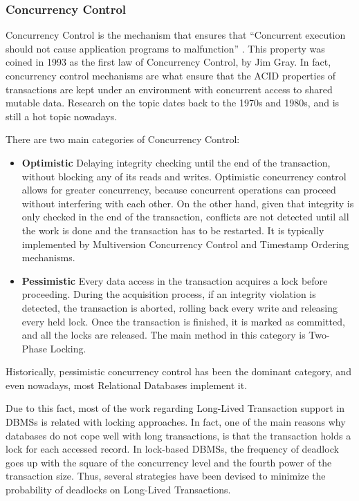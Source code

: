 \documentclass{llncs}
\begin{document}
\subsubsection{Concurrency Control}

Concurrency Control is the mechanism that ensures that ``Concurrent
execution should not cause application programs to malfunction''
\cite{reuter1993transaction}. This property was coined in 1993 as the
first law of Concurrency Control, by Jim Gray. In fact, concurrency
control mechanisms are what ensure that the ACID properties of
transactions are kept under an environment with concurrent access to
shared mutable data. Research on the topic dates back to the
1970s\cite{rosenkrantz1978system} and 1980s\cite{gray1981transaction},
and is still a hot topic nowadays.

There are two main categories of Concurrency Control:

\begin{itemize}

\item {\bf Optimistic} Delaying integrity checking until the end of
  the transaction, without blocking any of its reads and writes.
  Optimistic concurrency control allows for greater concurrency,
  because concurrent operations can proceed without interfering with
  each other. On the other hand, given that integrity is only checked
  in the end of the transaction, conflicts are not detected until all
  the work is done and the transaction has to be restarted. It is
  typically implemented by Multiversion Concurrency Control and
  Timestamp Ordering mechanisms\cite{Bernstein1981}.

\item {\bf Pessimistic} Every data access in the transaction acquires
  a lock before proceeding. During the acquisition process, if an
  integrity violation is detected, the transaction is aborted, rolling
  back every write and releasing every held lock. Once the transaction
  is finished, it is marked as committed, and all the locks are
  released. The main method in this category is Two-Phase
  Locking\cite{Bernstein1981}.

\end{itemize}

Historically, pessimistic concurrency control has been the dominant
category, and even nowadays, most Relational Databases implement it.

Due to this fact, most of the work regarding Long-Lived Transaction
support in DBMSs is related with locking approaches. In fact, one of
the main reasons why databases do not cope well with long
transactions, is that the transaction holds a lock for each accessed
record. In lock-based DBMSs, the frequency of deadlock goes up with
the square of the concurrency level and the fourth power of the
transaction size\cite{gray1981transaction}. Thus, several strategies
have been devised to minimize the probability of deadlocks on
Long-Lived Transactions.
\end{document}
